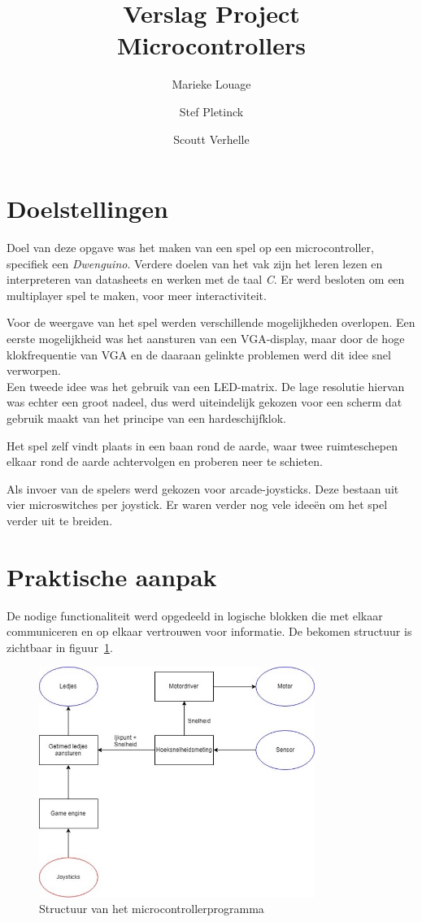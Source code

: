 \documentclass[12pt]{ugentreport}
\title{Verslag Project\\[0.1em]Microcontrollers}
\author{Marieke Louage\and Stef Pletinck\and Scoutt Verhelle}
\begin{document}
\maketitle

\tableofcontents
\listoffigures
\listoftodos
\newpage

\section{Doelstellingen}
Doel van deze opgave was het maken van een spel op een microcontroller,
specifiek een \emph{Dwenguino}.
Verdere doelen van het vak zijn het leren lezen en interpreteren van datasheets
en werken met de taal \emph{C}.
Er werd besloten om een multiplayer spel te maken,
voor meer interactiviteit.

Voor de weergave van het spel werden verschillende mogelijkheden overlopen.
Een eerste mogelijkheid was het aansturen van een VGA-display,
maar door de hoge klokfrequentie van VGA en de daaraan gelinkte problemen
werd dit idee snel verworpen.\\
Een tweede idee was het gebruik van een LED-matrix.
De lage resolutie hiervan was echter een groot nadeel,
dus werd uiteindelijk gekozen voor een scherm dat gebruik maakt
van het principe van een hardeschijfklok.

Het spel zelf vindt plaats in een baan rond de aarde, waar twee ruimteschepen
elkaar rond de aarde achtervolgen en proberen neer te schieten.

Als invoer van de spelers werd gekozen voor arcade-joysticks.
Deze bestaan uit vier microswitches per joystick.
Er waren verder nog vele ideeën om het spel verder uit te breiden.

\section{Praktische aanpak}
De nodige functionaliteit werd opgedeeld in logische blokken die met elkaar
communiceren en op elkaar vertrouwen voor informatie. De bekomen structuur is
zichtbaar in figuur~\ref{fig:structuur}.

\begin{figure}
  \centering
  \includegraphics[width=0.8\textwidth]{img/structuur.jpg}
  \caption{Structuur van het microcontrollerprogramma}
  \label{fig:structuur}
\end{figure}
\end{document}
